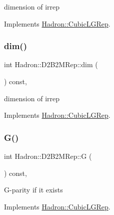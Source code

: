 dimension of irrep 

Implements \mbox{\hyperlink{structHadron_1_1CubicLGRep_a3acbaea26503ed64f20df693a48e4cdd}{Hadron\+::\+Cubic\+L\+G\+Rep}}.

\mbox{\label{structHadron_1_1D2B2MRep_a5beebf66fecabd7ee94b861df9f607c9}} 
\subsubsection{\texorpdfstring{dim()}{dim()}\hspace{0.1cm}{\footnotesize\ttfamily [2/2]}}
{\footnotesize\ttfamily int Hadron\+::\+D2\+B2\+M\+Rep\+::dim (\begin{DoxyParamCaption}{ }\end{DoxyParamCaption}) const\hspace{0.3cm}{\ttfamily [inline]}, {\ttfamily [virtual]}}

dimension of irrep 

Implements \mbox{\hyperlink{structHadron_1_1CubicLGRep_a3acbaea26503ed64f20df693a48e4cdd}{Hadron\+::\+Cubic\+L\+G\+Rep}}.

\mbox{\label{structHadron_1_1D2B2MRep_a084bfd1709cfe35d65be35b8950cb32c}} 
\subsubsection{\texorpdfstring{G()}{G()}\hspace{0.1cm}{\footnotesize\ttfamily [1/2]}}
{\footnotesize\ttfamily int Hadron\+::\+D2\+B2\+M\+Rep\+::G (\begin{DoxyParamCaption}{ }\end{DoxyParamCaption}) const\hspace{0.3cm}{\ttfamily [inline]}, {\ttfamily [virtual]}}

G-\/parity if it exists 

Implements \mbox{\hyperlink{structHadron_1_1CubicLGRep_ace26f7b2d55e3a668a14cb9026da5231}{Hadron\+::\+Cubic\+L\+G\+Rep}}.

\mbox{\label{structHadron_1_1D2B2MRep_a084bfd1709cfe35d65be35b8950cb32c}} 
